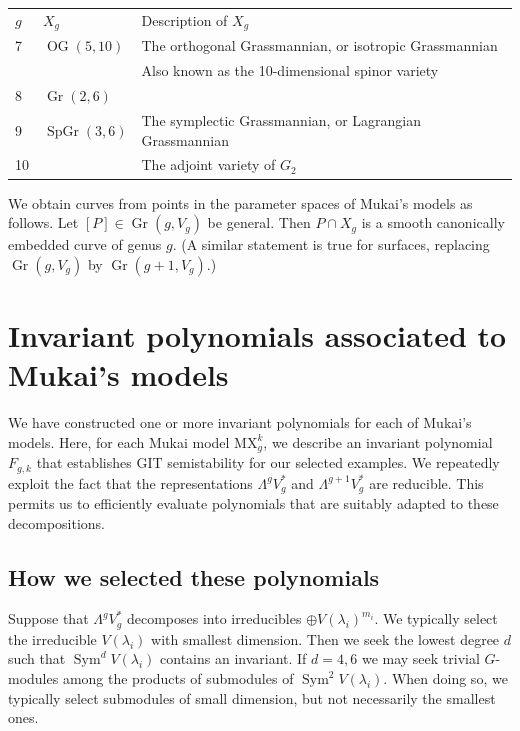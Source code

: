 \documentclass{amsart}[12pt]
\theoremstyle{definition}
\numberwithin{equation}{section}
\newcommand{\Sym}{\operatorname{Sym}}
\newcommand{\OG}{\operatorname{OG}(5,10)}
\newcommand{\SpGr}{\operatorname{SpGr}(3,6)}
\newcommand{\Gr}{\operatorname{Gr}}
\newcommand{\mywedge}{\mathsf{\Lambda}}
\newcommand{\mukai}{\mathrm{MX}}
\begin{document}
\begin{center}
\begin{tabular}{lll}
  $g$ & $X_g$ & Description of $X_g$ \\
  7 & $\OG$ & The orthogonal Grassmannian, or isotropic Grassmannian\\
                    && Also known as the 10-dimensional spinor variety \\
  8 & $\Gr(2,6)$ & \\
  9 & $\SpGr$ & The symplectic Grassmannian, or Lagrangian Grassmannian\\
  10 & & The adjoint variety of $G_2$
\end{tabular}
\end{center}

We obtain curves from points in the parameter spaces of
Mukai's models as follows. Let $[P] \in \Gr(g,V_g)$ be general. Then $P \cap
X_g$ is a smooth canonically embedded curve of genus $g$. (A similar
statement is true for surfaces, replacing $\Gr(g,V_g)$ by $\Gr(g+1,V_g)$.)



\section{Invariant polynomials associated to Mukai's
  models} \label{sec: invariant polynomials}

We have constructed one or more invariant polynomials for each of
Mukai's models. Here, for each Mukai model $\mukai^{k}_g$, we describe
an invariant polynomial $F_{g,k}$ that establishes GIT semistability
for our selected examples. We repeatedly
exploit the fact that the representations $\mywedge^{g} V_g^{*}$ and
$\mywedge^{g+1} V_g^{*}$ are reducible. This permits us to efficiently evaluate
polynomials that are suitably adapted to these decompositions. 


\subsection{How we selected these polynomials}
Suppose that $\mywedge^{g} V_g^{*}$ decomposes into irreducibles
$\oplus V(\lambda_i)^{m_i}$. We typically select the irreducible $V(\lambda_i)$ with smallest dimension. Then we seek the lowest degree $d$ such that $\Sym^d V(\lambda_i)$ contains an invariant. If $d=4,6$ we may seek trivial $G$-modules among the products of submodules of $\Sym^2 V(\lambda_i)$. When doing so, we typically select submodules of small dimension, but not necessarily the smallest ones.%
\end{document}
